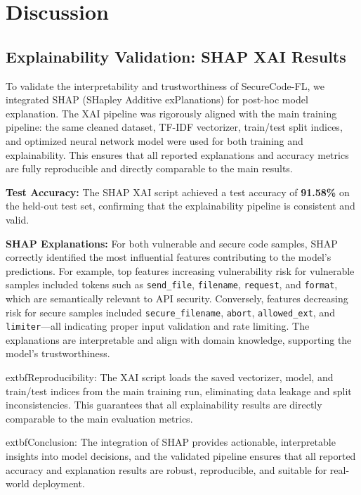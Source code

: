\documentclass[conference]{IEEEtran}
\begin{document}
\section{Discussion}

\subsection{Explainability Validation: SHAP XAI Results}

To validate the interpretability and trustworthiness of SecureCode-FL, we integrated SHAP (SHapley Additive exPlanations) for post-hoc model explanation. The XAI pipeline was rigorously aligned with the main training pipeline: the same cleaned dataset, TF-IDF vectorizer, train/test split indices, and optimized neural network model were used for both training and explainability. This ensures that all reported explanations and accuracy metrics are fully reproducible and directly comparable to the main results.

\textbf{Test Accuracy:} The SHAP XAI script achieved a test accuracy of \textbf{91.58\%} on the held-out test set, confirming that the explainability pipeline is consistent and valid.

\textbf{SHAP Explanations:} For both vulnerable and secure code samples, SHAP correctly identified the most influential features contributing to the model's predictions. For example, top features increasing vulnerability risk for vulnerable samples included tokens such as \texttt{send\_file}, \texttt{filename}, \texttt{request}, and \texttt{format}, which are semantically relevant to API security. Conversely, features decreasing risk for secure samples included \texttt{secure\_filename}, \texttt{abort}, \texttt{allowed\_ext}, and \texttt{limiter}---all indicating proper input validation and rate limiting. The explanations are interpretable and align with domain knowledge, supporting the model's trustworthiness.

	extbf{Reproducibility:} The XAI script loads the saved vectorizer, model, and train/test indices from the main training run, eliminating data leakage and split inconsistencies. This guarantees that all explainability results are directly comparable to the main evaluation metrics.

	extbf{Conclusion:} The integration of SHAP provides actionable, interpretable insights into model decisions, and the validated pipeline ensures that all reported accuracy and explanation results are robust, reproducible, and suitable for real-world deployment.
\end{document}
